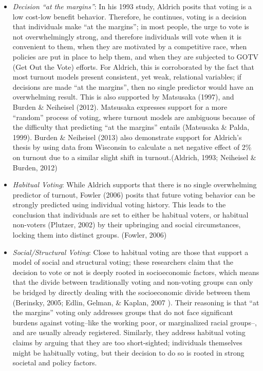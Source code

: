 \documentclass[12pt,twoside]{reedthesis}
\begin{document}
  \begin{itemize}
  \item
    \emph{Decision ``at the margins''}: In his 1993 study, Aldrich posits
    that voting is a low cost-low benefit behavior. Therefore, he
    continues, voting is a decision that individuals make ``at the
    margins''; in most people, the urge to vote is not overwhelmingly
    strong, and therefore individuals will vote when it is convenient to
    them, when they are motivated by a competitive race, when policies are
    put in place to help them, and when they are subjected to GOTV (Get
    Out the Vote) efforts. For Aldrich, this is corroborated by the fact
    that most turnout models present consistent, yet weak, relational
    variables; if decisions are made ``at the margins'', then no single
    predictor would have an overwhelming result. This is also supported by
    Matsusaka (1997), and Burden \& Neiheisel (2012). Matsusaka expresses
    support for a more ``random'' process of voting, where turnout models
    are ambiguous because of the difficulty that predicting ``at the
    margins'' entails (Matsusaka \& Palda, 1999). Burden \& Neiheisel
    (2013) also demonstrate support for Aldrich's thesis by using data
    from Wisconsin to calculate a net negative effect of 2\% on turnout
    due to a similar slight shift in turnout.(Aldrich, 1993; Neiheisel \&
    Burden, 2012)
  \item
    \emph{Habitual Voting}: While Aldrich supports that there is no single
    overwhelming predictor of turnout, Fowler (2006) posits that future
    voting behavior can be strongly predicted using individual voting
    history. This leads to the conclusion that individuals are set to
    either be habitual voters, or habitual non-voters (Plutzer, 2002) by
    their upbringing and social circumstances, locking them into distinct
    groups. (Fowler, 2006)
  \item
    \emph{Social/Structural Voting}: Close to habitual voting are those
    that support a model of social and structural voting; these
    researchers claim that the decision to vote or not is deeply rooted in
    socioeconomic factors, which means that the divide between
    traditionally voting and non-voting groups can only be bridged by
    directly dealing with the socioeconomic divide between them (Berinsky,
    2005; Edlin, Gelman, \& Kaplan, 2007 ). Their reasoning is that ``at
    the margins'' voting only addresses groups that do not face
    significant burdens against voting--like the working poor, or
    marginalized racial groups--, and are usually already registered.
    Similarly, they address habitual voting claims by arguing that they
    are too short-sighted; individuals themselves might be habitually
    voting, but their decision to do so is rooted in strong societal and
    policy factors.
  \end{itemize}
  
\end{document}
